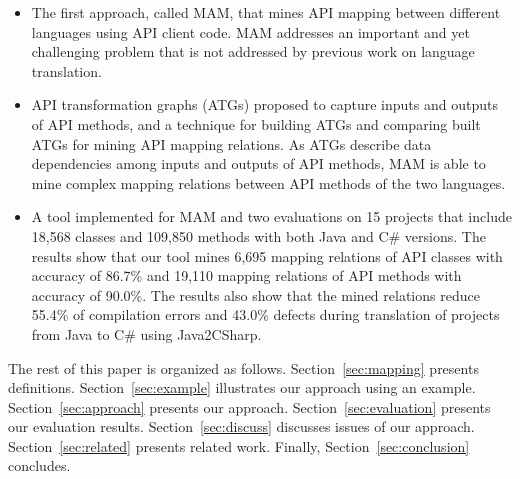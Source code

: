 \begin{itemize}\vspace*{-1.5ex}
\item The first approach, called MAM, that mines API mapping between
different languages using API client code. MAM
addresses an important and yet challenging problem that is not
addressed by previous work on language translation.\vspace*{-1.5ex}
\item API transformation graphs (ATGs) proposed to capture inputs
and outputs of API methods, and a technique for building ATGs and
comparing built ATGs for mining API mapping relations. As ATGs describe data
dependencies among inputs and outputs of API methods, MAM is able to
mine complex mapping relations between API methods of the two
languages.\vspace*{-1.5ex}
\item A tool implemented for MAM and two
evaluations on 15 projects that include 18,568 classes and 109,850
methods with both Java and C\# versions. The results show that our
tool mines 6,695 mapping relations of API classes with accuracy of
86.7\% and 19,110 mapping relations of API methods with accuracy of
90.0\%. The results also show that the mined relations
reduce 55.4\% of compilation errors and 43.0\% defects during
translation of projects from Java to C\# using Java2CSharp.
\end{itemize}\vspace*{-1.5ex}

The rest of this paper is organized as follows.
Section~\ref{sec:mapping} presents definitions.
Section~\ref{sec:example} illustrates our approach using an example.
Section~\ref{sec:approach} presents our approach.
Section~\ref{sec:evaluation} presents our evaluation results.
Section~\ref{sec:discuss} discusses issues of our approach.
Section~\ref{sec:related} presents related work.
Finally, Section~\ref{sec:conclusion} concludes.
